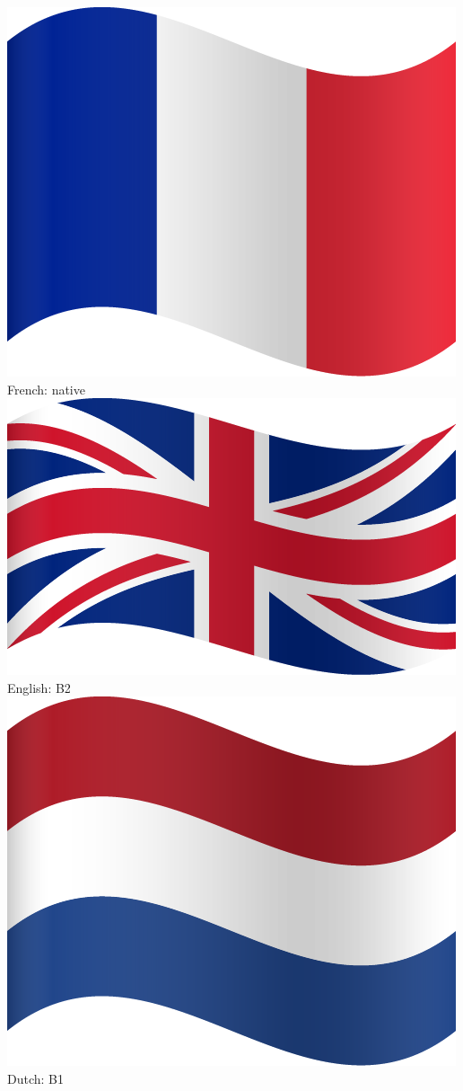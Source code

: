 \documentclass[]{deedy-resume-openfont}
\begin{document}
\begin{minipage}[t]{0.35\textwidth}
\includegraphics[scale=0.015]{images/france.png}  French: native \\
\includegraphics[scale=0.015]{images/uk.png}  English: B2 \\
\includegraphics[scale=0.015]{images/netherlands.png}  Dutch: B1 \\



\end{minipage}
\end{document}
